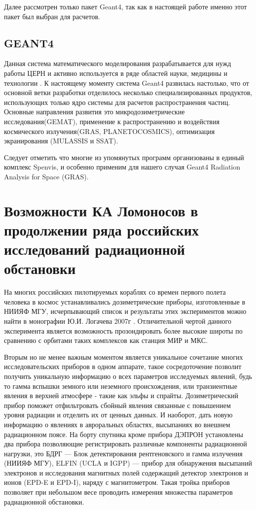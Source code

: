 Далее рассмотрен только пакет Geant4, так как в настоящей работе именно этот пакет 
был выбран для расчетов. 


\subsection{GEANT4}

Данная система математического моделирования разрабатывается для нужд работы 
ЦЕРН и активно используется в ряде областей науки, медицины и технологии 
\cite{Agostinelli2003}.
К настоящему моменту система Geant4 развилась настолько, что от основной ветки 
разработки отделилось несколько специализированных продуктов, использующих 
только ядро системы для расчетов распространения частиц. Основные направления 
развития это микродозиметрические исследования(GEMAT), применение к 
распространению и 
воздействия космического излучения(GRAS, PLANETOCOSMICS), оптимизация 
экранирования (MULASSIS \cite{Lei2002} и SSAT). 

Следует отметить что многие из упомянутых программ организованы в единый комплекс Spenvis,
 и особенно применим для нашего случая  Geant4 Radiation Analysis for Space (GRAS).

\section{Возможности КА Ломоносов в продолжении ряда российских исследований радиационной обстановки}

На многих российских пилотируемых кораблях со времен первого полета человека в космос устанавливались дозиметрические приборы, изготовленные в НИИЯФ МГУ, исчерпывающий список и результаты этих экспериментов можно найти в монографии Ю.И. Логачева 2007г \cite{logachev2007}. Отличительной чертой данного эксперимента является возможность прозондировать более высокие широты по сравнению с орбитами таких комплексов как станция МИР и МКС. 

Вторым но не менее важным моментом является уникальное сочетание многих исследовательских приборов в одном аппарате, такое сосредоточение позволит получить уникальную информацию о всех параметров исследуемых явлений, будь то гамма вспышки земного или неземного происхождения, или транзиентные явления в верхней атмосфере - такие как эльфы и спрайты. Дозиметрический прибор поможет отфильтровать сбойный явления связанные с повышением уровня радиации и отделить их от ценных данных. И наоборот, дать новую информацию о явлениях в авроральных областях, высыпаниях во внешнем радиационном поясе.
На борту спутника кроме прибора ДЭПРОН установлены два прибора позволяющие регистрировать различные компоненты радиационной нагрузки, это БДРГ --- Блок детектирования рентгеновского и гамма излучения (НИИЯФ МГУ), ELFIN (UCLA и IGPP) --- прибор для обнаружения высыпаний электронов и исследования магнитных полей содержащий детектор электронов и ионов (EPD-E и EPD-I), наряду с магнитометром. Такая тройка приборов позволяет при небольшом весе проводить измерения множества  параметров радиационной обстановки.



